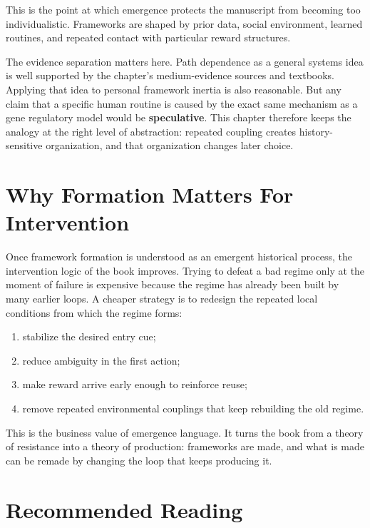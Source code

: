 \begin{remark}
This is the point at which emergence protects the manuscript from becoming too
individualistic. Frameworks are shaped by prior data, social environment,
learned routines, and repeated contact with particular reward structures.
\end{remark}

The evidence separation matters here. Path dependence as a general systems idea
is well supported by the chapter's medium-evidence sources and textbooks.
Applying that idea to personal framework inertia is also reasonable. But any
claim that a specific human routine is caused by the exact same mechanism as a
gene regulatory model would be \textbf{speculative}. This chapter therefore
keeps the analogy at the right level of abstraction: repeated coupling creates
history-sensitive organization, and that organization changes later choice.

\section{Why Formation Matters For Intervention}

Once framework formation is understood as an emergent historical process, the
intervention logic of the book improves. Trying to defeat a bad regime only at
the moment of failure is expensive because the regime has already been built by
many earlier loops. A cheaper strategy is to redesign the repeated local
conditions from which the regime forms:
\begin{enumerate}[nosep]
  \item stabilize the desired entry cue;
  \item reduce ambiguity in the first action;
  \item make reward arrive early enough to reinforce reuse;
  \item remove repeated environmental couplings that keep rebuilding the old
        regime.
\end{enumerate}

This is the business value of emergence language. It turns the book from a
theory of resistance into a theory of production: frameworks are made, and what
is made can be remade by changing the loop that keeps producing it.

\section{Recommended Reading}

